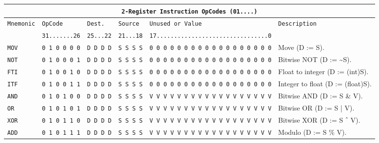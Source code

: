 \documentclass{report}
\begin{document}
{\footnotesize
\begin{center}
\begin{tabular}[ht]{
	| p{} | p{} | p{} | p{}
	| p{} | p{} |
}
	\hline
	\multicolumn{6}{|c|}{\texttt{2-Register Instruction OpCodes (01....)}} \\
	\hline \hline
	
	\multirow{2}{*}{\texttt{Mnemonic}} & \texttt{OpCode} & \texttt{Dest.} & \texttt{Source} &
		\texttt{Unused or Value} & \multirow{2}{*}{\texttt{Description}} \\
	& \texttt{31.......26} & \texttt{25...22} & \texttt{21...18} & \texttt{17................................0} & \\
	\hline
	
	\texttt{MOV} & \texttt{0 1 0 0 0 0} & \texttt{D D D D} & \texttt{S S S S} &
		\texttt{0 0 0 0 0 0 0 0 0 0 0 0 0 0 0 0 0 0} & Move (D := S). \\
	\hline
	
	\texttt{NOT} & \texttt{0 1 0 0 0 1} & \texttt{D D D D} & \texttt{S S S S} &
		\texttt{0 0 0 0 0 0 0 0 0 0 0 0 0 0 0 0 0 0} & Bitwise NOT (D := \textasciitilde S). \\
	\hline
	
	\texttt{FTI} & \texttt{0 1 0 0 1 0} & \texttt{D D D D} & \texttt{S S S S} &
		\texttt{0 0 0 0 0 0 0 0 0 0 0 0 0 0 0 0 0 0} & Float to integer (D := (int)S). \\
	\hline
	
	\texttt{ITF} & \texttt{0 1 0 0 1 1} & \texttt{D D D D} & \texttt{S S S S} &
		\texttt{0 0 0 0 0 0 0 0 0 0 0 0 0 0 0 0 0 0} & Integer to float (D := (float)S). \\
	\hline
	
	\texttt{AND} & \texttt{0 1 0 1 0 0} & \texttt{D D D D} & \texttt{S S S S} &
		\texttt{V V V V V V V V V V V V V V V V V V} & Bitwise AND (D := S \& V). \\
	\hline
	
	\texttt{OR} & \texttt{0 1 0 1 0 1} & \texttt{D D D D} & \texttt{S S S S} &
		\texttt{V V V V V V V V V V V V V V V V V V} & Bitwise OR (D := S | V). \\
	\hline
	
	\texttt{XOR} & \texttt{0 1 0 1 1 0} & \texttt{D D D D} & \texttt{S S S S} &
		\texttt{V V V V V V V V V V V V V V V V V V} & Bitwise XOR (D := S ${\mathchar"5E}$ V). \\
	\hline
	
	\texttt{ADD} & \texttt{0 1 0 1 1 1} & \texttt{D D D D} & \texttt{S S S S} &
		\texttt{V V V V V V V V V V V V V V V V V V} & Modulo (D := S \% V). \\
	\hline
	

\end{tabular}
\end{center}}
\end{document}
